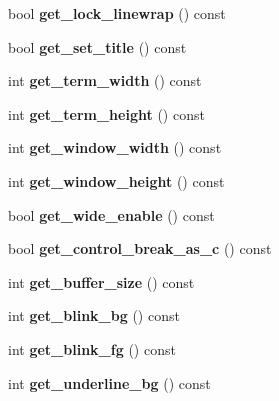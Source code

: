 \begin{DoxyCompactItemize}
bool {\bfseries get\+\_\+lock\+\_\+linewrap} () const
\item 
\mbox{\label{class_t_config_a8840247a10ef780ef7c9b92b5b3e8aee}} 
bool {\bfseries get\+\_\+set\+\_\+title} () const
\item 
\mbox{\label{class_t_config_aa26815b81c1ee81d33f43a3c3b173597}} 
int {\bfseries get\+\_\+term\+\_\+width} () const
\item 
\mbox{\label{class_t_config_a0e69fcae0c4df067804f2b01464eaeaa}} 
int {\bfseries get\+\_\+term\+\_\+height} () const
\item 
\mbox{\label{class_t_config_a57b158f1b1c21d8a97ae45aad9b7dbfd}} 
int {\bfseries get\+\_\+window\+\_\+width} () const
\item 
\mbox{\label{class_t_config_af83dbbfb3ac61e52c9b4031363be7928}} 
int {\bfseries get\+\_\+window\+\_\+height} () const
\item 
\mbox{\label{class_t_config_a4ad726312ba6a338332ca7e0c9c1fb96}} 
bool {\bfseries get\+\_\+wide\+\_\+enable} () const
\item 
\mbox{\label{class_t_config_ab972d317b85a5a9919eed8a3f8b23d4f}} 
bool {\bfseries get\+\_\+control\+\_\+break\+\_\+as\+\_\+c} () const
\item 
\mbox{\label{class_t_config_aa1efef280a4e8484945270e925c7916b}} 
int {\bfseries get\+\_\+buffer\+\_\+size} () const
\item 
\mbox{\label{class_t_config_ae8df8f209556b1fed75ec6d014c9148b}} 
int {\bfseries get\+\_\+blink\+\_\+bg} () const
\item 
\mbox{\label{class_t_config_ab80efdca0021dcb5ca7920919204cfb1}} 
int {\bfseries get\+\_\+blink\+\_\+fg} () const
\item 
\mbox{\label{class_t_config_a709f78ce8dd002db8fddb152800296ae}} 
int {\bfseries get\+\_\+underline\+\_\+bg} () const
\item 
\mbox{\label{class_t_config_a721f0adda93559726fa4a64d88e19ab2}} 

\end{DoxyCompactItemize}

